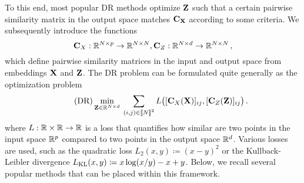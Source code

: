 To this end, most popular DR methods optimize ${\mathbf{Z}}$ such that a certain pairwise similarity matrix in the output space matches ${\mathbf{C}}_{{\mathbf{X}}}$ according to some criteria. We subsequently introduce the functions
\begin{equation}
\label{eq:sim_function}
{\mathbf{C}}_{X}: \mathbb{R}^{N \times p} \to \mathbb{R}^{N \times N}, {\mathbf{C}}_{Z}: \mathbb{R}^{N \times d} \to \mathbb{R}^{N \times N}\,,
\end{equation}
which define pairwise similarity matrices in the input and output space from embeddings ${\mathbf{X}}$ and ${\mathbf{Z}}$.
 The DR problem can be formulated quite generally as the optimization problem
\begin{equation}
\label{eq:DR_criterion}\tag{DR}
\min_{\mZ \in \R^{N \times d}} \: \sum_{(i,j) \in \integ{N}^2}  L\big([\simiX(\mX)]_{ij}, [\simi(\mZ)]_{ij}\big) \,. %
\end{equation}
where $L:\mathbb{R} \times \mathbb{R} \rightarrow \mathbb{R}$ is a loss that quantifies how similar are two points in the input space $\mathbb{R}^{p}$ compared to two points in the output space $\mathbb{R}^{d}$. Various losses are used, such as the quadratic loss $L_2(x,y) \coloneqq (x - y)^2$
or the Kullback-Leibler divergence $L_{\operatorname{KL}}(x,y) \coloneqq x \log (x/y) - x +y$.
Below, we recall several popular methods that can be placed within this framework.

